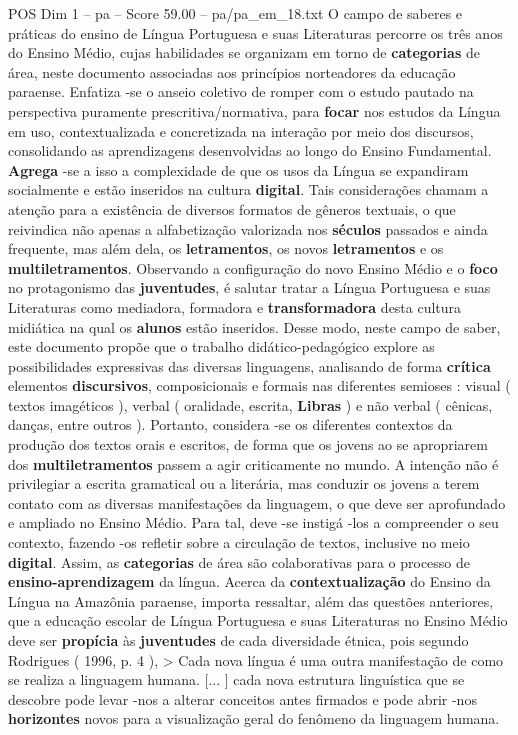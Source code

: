 \begin{textsample}{POS Dim 1 – pa – Score 59.00 – pa/pa\_em\_18.txt}
O campo de saberes e práticas do ensino de Língua Portuguesa e suas Literaturas percorre os três anos do Ensino Médio, cujas habilidades se organizam em torno de \textbf{categorias} de área, neste documento associadas aos princípios norteadores da educação paraense.
Enfatiza -se o anseio coletivo de romper com o estudo pautado na perspectiva puramente prescritiva/normativa, para \textbf{focar} nos estudos da Língua em uso, contextualizada e concretizada na interação por meio dos discursos, consolidando as aprendizagens desenvolvidas ao longo do Ensino Fundamental. \textbf{Agrega} -se a isso a complexidade de que os usos da Língua se expandiram socialmente e estão inseridos na cultura \textbf{digital}.
Tais considerações chamam a atenção para a existência de diversos formatos de gêneros textuais, o que reivindica não apenas a alfabetização valorizada nos \textbf{séculos} passados e ainda frequente, mas além dela, os \textbf{letramentos}, os novos \textbf{letramentos} e os \textbf{multiletramentos}.
Observando a configuração do novo Ensino Médio e o \textbf{foco} no protagonismo das \textbf{juventudes}, é salutar tratar a Língua Portuguesa e suas Literaturas como mediadora, formadora e \textbf{transformadora} desta cultura midiática na qual os \textbf{alunos} estão inseridos.
Desse modo, neste campo de saber, este documento propõe que o trabalho didático-pedagógico explore as possibilidades expressivas das diversas linguagens, analisando de forma \textbf{crítica} elementos \textbf{discursivos}, composicionais e formais nas diferentes semioses : visual ( textos imagéticos ), verbal ( oralidade, escrita, \textbf{Libras} ) e não verbal ( cênicas, danças, entre outros ).
Portanto, considera -se os diferentes contextos da produção dos textos orais e escritos, de forma que os jovens ao se apropriarem dos \textbf{multiletramentos} passem a agir criticamente no mundo.
A intenção não é privilegiar a escrita gramatical ou a literária, mas conduzir os jovens a terem contato com as diversas manifestações da linguagem, o que deve ser aprofundado e ampliado no Ensino Médio.
Para tal, deve -se instigá -los a compreender o seu contexto, fazendo -os refletir sobre a circulação de textos, inclusive no meio \textbf{digital}.
Assim, as \textbf{categorias} de área são colaborativas para o processo de \textbf{ensino-aprendizagem} da língua.
Acerca da \textbf{contextualização} do Ensino da Língua na Amazônia paraense, importa ressaltar, além das questões anteriores, que a educação escolar de Língua Portuguesa e suas Literaturas no Ensino Médio deve ser \textbf{propícia} às \textbf{juventudes} de cada diversidade étnica, pois segundo Rodrigues ( 1996, p. 4 ), > Cada nova língua é uma outra manifestação de como se realiza a linguagem humana. [... ] cada nova estrutura linguística que se descobre pode levar -nos a alterar conceitos antes firmados e pode abrir -nos \textbf{horizontes} novos para a visualização geral do fenômeno da linguagem humana.

\end{textsample}

